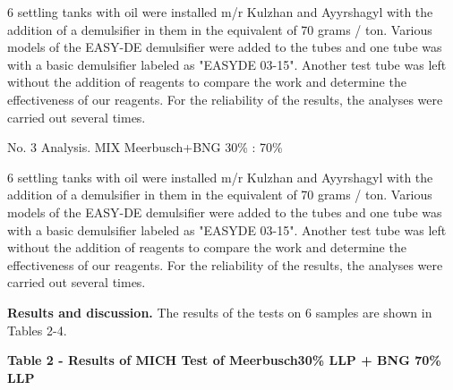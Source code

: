 6 settling tanks with oil were installed m/r Kulzhan and Ayyrshagyl with
the addition of a demulsifier in them in the equivalent of 70 grams /
ton. Various models of the EASY-DE demulsifier were added to the tubes
and one tube was with a basic demulsifier labeled as "EASYDE 03-15".
Another test tube was left without the addition of reagents to compare
the work and determine the effectiveness of our reagents. For the
reliability of the results, the analyses were carried out several times.

No. 3 Analysis. MIX Meerbusch+BNG 30\% : 70\%

6 settling tanks with oil were installed m/r Kulzhan and Ayyrshagyl with
the addition of a demulsifier in them in the equivalent of 70 grams /
ton. Various models of the EASY-DE demulsifier were added to the tubes
and one tube was with a basic demulsifier labeled as "EASYDE 03-15".
Another test tube was left without the addition of reagents to compare
the work and determine the effectiveness of our reagents. For the
reliability of the results, the analyses were carried out several times.

\textbf{Results and discussion.} The results of the tests on 6 samples
are shown in Tables 2-4.

\textbf{Table 2 - Results of MICH Test of Meerbusch30\% LLP + BNG 70\%
LLP}

